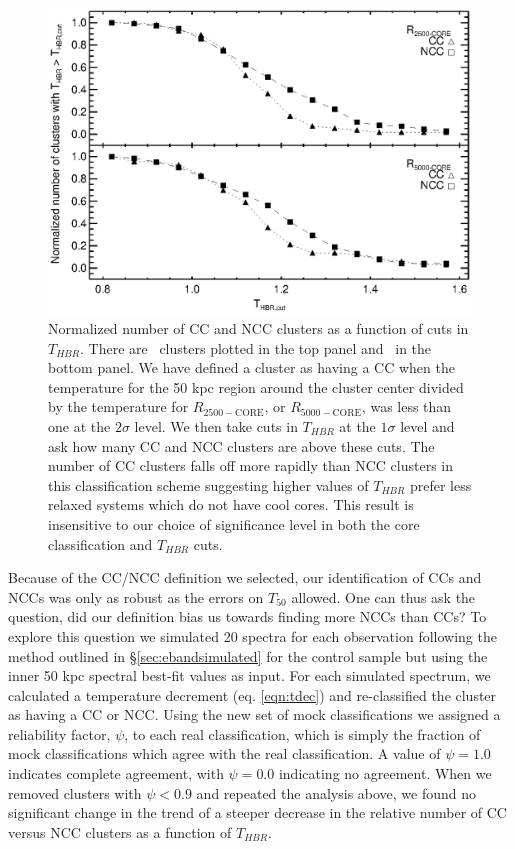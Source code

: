 \begin{figure}
\begin{center}
\includegraphics*[width=\textwidth, trim=15mm 10mm 0mm 0mm, clip]{eband_f7.eps}
\caption[Number of cool and non-cool clusters as a function of
  $T_{HBR}$]{Normalized number of CC and NCC clusters as a function of
  cuts in $T_{HBR}$. There are \ebandnuma\ clusters plotted in the top panel
  and \ebandnumb\ in the bottom panel. We have defined a cluster as having a
  CC when the temperature for the 50 kpc region around the cluster
  center divided by the temperature for $R_{2500-\mathrm{CORE}}$, or
  $R_{5000-\mathrm{CORE}}$, was less than one at the $2\sigma$
  level. We then take cuts in $T_{HBR}$ at the $1\sigma$ level and ask
  how many CC and NCC clusters are above these cuts. The number of CC
  clusters falls off more rapidly than NCC clusters in this
  classification scheme suggesting higher values of $T_{HBR}$ prefer
  less relaxed systems which do not have cool cores. This result is
  insensitive to our choice of significance level in both the core
  classification and $T_{HBR}$ cuts.  }
\label{fig:cc_ncc_bin}
\end{center}
\end{figure}

Because of the CC/NCC definition we selected, our identification of
CCs and NCCs was only as robust as the errors on $T_{50}$ allowed. One
can thus ask the question, did our definition bias us towards finding
more NCCs than CCs? To explore this question we simulated 20 spectra
for each observation following the method outlined in
\S\ref{sec:ebandsimulated} for the control sample but using the inner 50
kpc spectral best-fit values as input. For each simulated spectrum, we
calculated a temperature decrement (eq. \ref{eqn:tdec}) and
re-classified the cluster as having a CC or NCC. Using the new set of
mock classifications we assigned a reliability factor, $\psi$, to each
real classification, which is simply the fraction of mock
classifications which agree with the real classification. A value of
$\psi = 1.0$ indicates complete agreement, with $\psi = 0.0$
indicating no agreement. When we removed clusters with $\psi < 0.9$
and repeated the analysis above, we found no significant change in the
trend of a steeper decrease in the relative number of CC versus NCC
clusters as a function of $T_{HBR}$.

